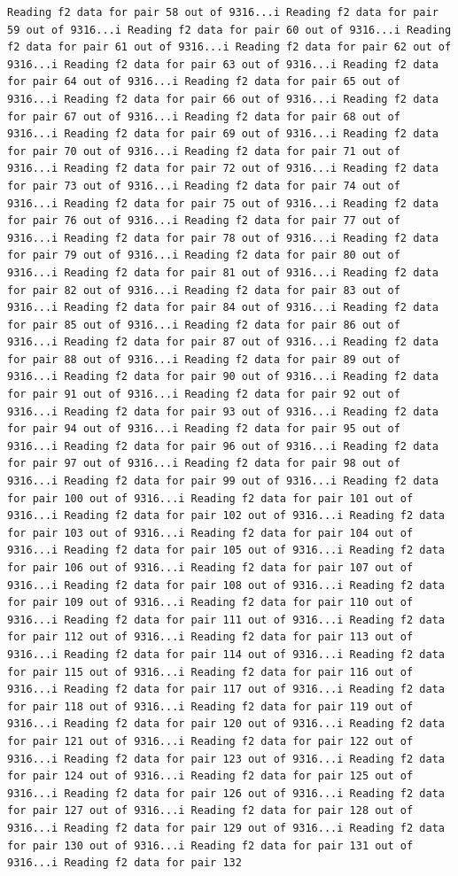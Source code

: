 \documentclass[
]{article}
\begin{document}
\begin{verbatim}
Reading f2 data for pair 58 out of 9316...i Reading f2 data for pair 59 out of 9316...i Reading f2 data for pair 60 out of 9316...i Reading f2 data for pair 61 out of 9316...i Reading f2 data for pair 62 out of 9316...i Reading f2 data for pair 63 out of 9316...i Reading f2 data for pair 64 out of 9316...i Reading f2 data for pair 65 out of 9316...i Reading f2 data for pair 66 out of 9316...i Reading f2 data for pair 67 out of 9316...i Reading f2 data for pair 68 out of 9316...i Reading f2 data for pair 69 out of 9316...i Reading f2 data for pair 70 out of 9316...i Reading f2 data for pair 71 out of 9316...i Reading f2 data for pair 72 out of 9316...i Reading f2 data for pair 73 out of 9316...i Reading f2 data for pair 74 out of 9316...i Reading f2 data for pair 75 out of 9316...i Reading f2 data for pair 76 out of 9316...i Reading f2 data for pair 77 out of 9316...i Reading f2 data for pair 78 out of 9316...i Reading f2 data for pair 79 out of 9316...i Reading f2 data for pair 80 out of 9316...i Reading f2 data for pair 81 out of 9316...i Reading f2 data for pair 82 out of 9316...i Reading f2 data for pair 83 out of 9316...i Reading f2 data for pair 84 out of 9316...i Reading f2 data for pair 85 out of 9316...i Reading f2 data for pair 86 out of 9316...i Reading f2 data for pair 87 out of 9316...i Reading f2 data for pair 88 out of 9316...i Reading f2 data for pair 89 out of 9316...i Reading f2 data for pair 90 out of 9316...i Reading f2 data for pair 91 out of 9316...i Reading f2 data for pair 92 out of 9316...i Reading f2 data for pair 93 out of 9316...i Reading f2 data for pair 94 out of 9316...i Reading f2 data for pair 95 out of 9316...i Reading f2 data for pair 96 out of 9316...i Reading f2 data for pair 97 out of 9316...i Reading f2 data for pair 98 out of 9316...i Reading f2 data for pair 99 out of 9316...i Reading f2 data for pair 100 out of 9316...i Reading f2 data for pair 101 out of 9316...i Reading f2 data for pair 102 out of 9316...i Reading f2 data for pair 103 out of 9316...i Reading f2 data for pair 104 out of 9316...i Reading f2 data for pair 105 out of 9316...i Reading f2 data for pair 106 out of 9316...i Reading f2 data for pair 107 out of 9316...i Reading f2 data for pair 108 out of 9316...i Reading f2 data for pair 109 out of 9316...i Reading f2 data for pair 110 out of 9316...i Reading f2 data for pair 111 out of 9316...i Reading f2 data for pair 112 out of 9316...i Reading f2 data for pair 113 out of 9316...i Reading f2 data for pair 114 out of 9316...i Reading f2 data for pair 115 out of 9316...i Reading f2 data for pair 116 out of 9316...i Reading f2 data for pair 117 out of 9316...i Reading f2 data for pair 118 out of 9316...i Reading f2 data for pair 119 out of 9316...i Reading f2 data for pair 120 out of 9316...i Reading f2 data for pair 121 out of 9316...i Reading f2 data for pair 122 out of 9316...i Reading f2 data for pair 123 out of 9316...i Reading f2 data for pair 124 out of 9316...i Reading f2 data for pair 125 out of 9316...i Reading f2 data for pair 126 out of 9316...i Reading f2 data for pair 127 out of 9316...i Reading f2 data for pair 128 out of 9316...i Reading f2 data for pair 129 out of 9316...i Reading f2 data for pair 130 out of 9316...i Reading f2 data for pair 131 out of 9316...i Reading f2 data for pair 132 
\end{verbatim}
\end{document}
